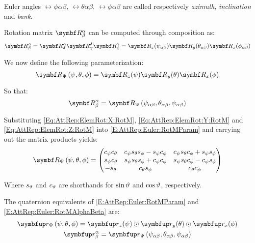 Euler angles $\rel{\psi}{\alpha}{\beta}$, $\rel{\theta}{\alpha}{\beta}$, $\rel{\psi}{\alpha}{\beta}$ are called respectively \emph{azimuth}, \emph{inclination} and \emph{bank}.

Rotation matrix $\RotM{\alpha}{\beta}$ can be computed through composition as:
\begin{equation*}
	\RotM{\alpha}{\beta} = \RotM{\alpha}{\delta} \RotM{\delta}{\gamma} \RotM{\gamma}{\beta} = \mat{\rotm_{z}}(\rel{\psi}{\alpha}{\beta}) \mat{\rotm_{y}}(\rel{\theta}{\alpha}{\beta}) \mat{\rotm_{x}}(\rel{\phi}{\alpha}{\beta})
\end{equation*}

We now define the following parameterization:
\begin{equation} \label{E:AttRep:Euler:RotMParam}
	\RotMEuler{\psi}{\theta}{\phi} = \mat{\rotm_{z}}(\psi) \mat{\rotm_{y}}(\theta) \mat{\rotm_{x}}(\phi)  
\end{equation}

So that:
\begin{equation} \label{E:AttRep:Euler:RotMAlphaBeta}
	\RotM{\alpha}{\beta} = \RotMEuler{\rel{\psi}{\alpha}{\beta}}{\rel{\theta}{\alpha}{\beta}}{\rel{\psi}{\alpha}{\beta}}
\end{equation}

Substituting \eqref{Eq:AttRep:ElemRot:X:RotM}, \eqref{Eq:AttRep:ElemRot:Y:RotM} and \eqref{Eq:AttRep:ElemRot:Z:RotM} into \eqref{E:AttRep:Euler:RotMParam} and carrying out the matrix products yields:
\begin{equation} \label{E:AttRep:Euler:RotMParamElem}
	\RotMEuler{\psi}{\theta}{\phi} =  
	\begin{pmatrix}
		c_{\psi} c_{\theta}	&	c_{\psi} s_{\theta} s_{\phi} - s_{\psi} c_{\phi}	&	c_{\psi} s_{\theta} c_{\phi} + s_{\psi} s_{\phi}\\
		s_{\psi} c_{\theta}	&	s_{\psi} s_{\theta} s_{\phi} + c_{\psi} c_{\phi}	&	s_{\psi} s_{\theta} c_{\phi} - c_{\psi} s_{\phi}\\
		-s_{\theta}			&	c_{\theta} s_{\phi}									&	c_{\theta} c_{\phi}	
	\end{pmatrix}	
\end{equation}

Where $s_\vartheta$ and $c_\vartheta$ are shorthands for $\sin \vartheta$ and $\cos \vartheta$, respectively.

The quaternion equivalents of \eqref{E:AttRep:Euler:RotMParam} and \eqref{E:AttRep:Euler:RotMAlphaBeta} are:
\begin{gather}
	\RotQEuler{\psi}{\theta}{\phi} = \quat{\rotq}_{z}(\psi) \qprod \quat{\rotq}_{y}(\theta) \qprod \quat{\rotq}_{x}(\phi)
	\label{E:AttRep:Euler:RotQParam}\\	
	\RotQ{\alpha}{\beta} = \RotQEuler{\rel{\psi}{\alpha}{\beta}} {\rel{\theta}{\alpha}{\beta}} {\rel{\psi}{\alpha}{\beta}}
	\label{E:AttRep:Euler:RotQAlphaBeta}
\end{gather}

